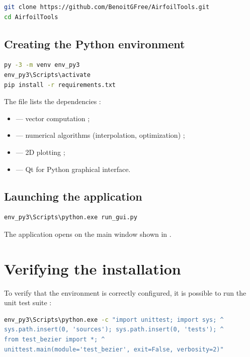 \begin{lstlisting}[language=bash,caption={Cloning the repository}]
git clone https://github.com/BenoitGFree/AirfoilTools.git
cd AirfoilTools
\end{lstlisting}

\subsection{Creating the Python environment}

\begin{lstlisting}[language=bash,caption={Creating the venv and installing
the dependencies (Windows)}]
py -3 -m venv env_py3
env_py3\Scripts\activate
pip install -r requirements.txt
\end{lstlisting}

The  file lists the dependencies :

\begin{itemize}
    \item {} --- vector computation ;
    \item {} --- numerical algorithms (interpolation,
        optimization) ;
    \item {} --- 2D plotting ;
    \item {} --- Qt for Python graphical interface.
\end{itemize}

\subsection{Launching the application}

\begin{lstlisting}[language=bash,caption={Starting the GUI}]
env_py3\Scripts\python.exe run_gui.py
\end{lstlisting}

The application opens on the main window shown in
.

\section{Verifying the installation}

To verify that the environment is correctly configured, it
is possible to run the unit test suite :

\begin{lstlisting}[language=bash,caption={Running the tests}]
env_py3\Scripts\python.exe -c "import unittest; import sys; ^
sys.path.insert(0, 'sources'); sys.path.insert(0, 'tests'); ^
from test_bezier import *; ^
unittest.main(module='test_bezier', exit=False, verbosity=2)"
\end{lstlisting}

